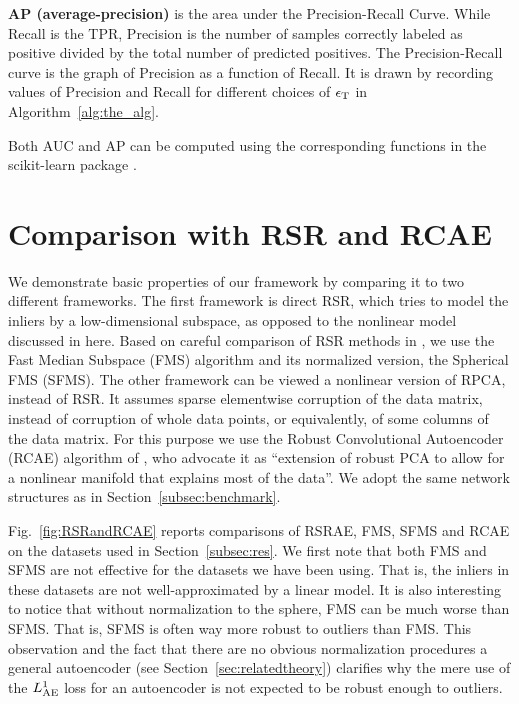 \documentclass{article} \usepackage{iclr2020_conference,times}
\def\Secref#1{Section~\ref{#1}}
\def\rvepsilon{{\mathbf{\epsilon}}}
\begin{document}
\textbf{AP (average-precision)} is the area under the Precision-Recall Curve. While Recall is the TPR, Precision is the number of samples correctly labeled as positive divided by the total number of predicted positives. The  Precision-Recall curve is the graph of  Precision as a function of Recall.
It is drawn by recording values of Precision and Recall for different choices of $\rvepsilon_{\rm{T}}$ in Algorithm~\ref{alg:the_alg}.



Both AUC and AP can be computed using the corresponding functions in the scikit-learn package \citep{scikit-learn}.



\section{Comparison with RSR and RCAE}
\label{sec:rsrandrpca}

We demonstrate basic properties of our framework by comparing it to two different frameworks. The first framework is direct RSR, which  tries to model the inliers by a low-dimensional subspace, as opposed to the nonlinear model discussed in here. Based on careful comparison of RSR methods in \citet{lerman2018overview}, we use the Fast Median Subspace (FMS) algorithm \citep{lerman2017fast} and its normalized version, the Spherical FMS (SFMS). The other framework can be viewed a nonlinear version of RPCA, instead of RSR. It assumes sparse elementwise corruption of the data matrix, instead of corruption of whole data points, or equivalently, of some columns of the data matrix. For this purpose we use the Robust Convolutional Autoencoder (RCAE) algorithm of \citet{chalapathy2017robust}, who advocate it as ``extension of robust PCA to allow for a nonlinear manifold that explains most of the data''.  We adopt the same network structures as in \Secref{subsec:benchmark}.


Fig.~\ref{fig:RSRandRCAE} reports comparisons of RSRAE, FMS, SFMS and RCAE on the datasets used in \Secref{subsec:res}. 
We first note that both FMS and SFMS are not effective for the datasets we have been using.  That is, the inliers in these datasets are not well-approximated by a linear model. It is also interesting to notice that without normalization to the sphere, FMS can be much worse than SFMS. That is, SFMS is often way more robust to outliers than FMS. This observation and the fact that there are no obvious normalization procedures a general autoencoder (see \Secref{sec:relatedtheory}) clarifies why the mere use of the $L_{\rm{AE}}^1$ loss for an autoencoder is not expected to be robust enough to outliers.
\end{document}
